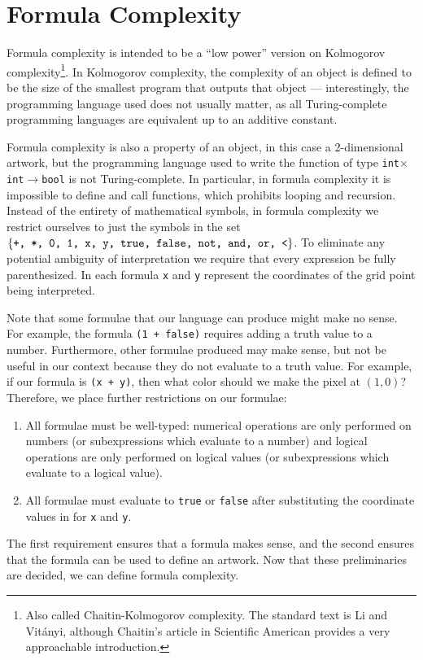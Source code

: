 \documentclass[11pt]{article}
\begin{document}
\section*{Formula Complexity}

Formula complexity is intended to be a ``low power'' version on Kolmogorov
complexity\footnote{Also called Chaitin-Kolmogorov complexity.  The standard
text is Li and Vit\'anyi\cite{Li}, although Chaitin's article in
Scientific American\cite{chaitin} provides a very approachable introduction.}.  In
Kolmogorov complexity, the complexity of an object is defined to be the size of
the smallest program that outputs that object --- interestingly, the
programming language used does not usually matter, as all Turing-complete
programming languages are equivalent up to an additive constant.

Formula complexity is also a property of an object, in this case a
2-dimensional artwork, but the programming language used to write the function
of type {\tt int$\times$int$\to$bool} is not Turing-complete.  In particular,
in formula complexity it is impossible to define and call functions, which
prohibits looping and recursion.  Instead of the entirety of mathematical
symbols, in formula complexity we restrict ourselves to just the symbols in the
set $\{\text{\tt +, *, 0, 1, x, y, true, false, not, and, or, <}\}$. To
eliminate any potential ambiguity of interpretation we require that every
expression be fully parenthesized.  In each formula {\tt x} and {\tt y}
represent the coordinates of the grid point being interpreted.  

Note that some formulae that our language can produce might make no sense.  For
example, the formula {\tt (1 + false)} requires adding a truth value to a
number.  Furthermore, other formulae produced may make sense, but not be useful
in our context because they do not evaluate to a truth value.  For example, if
our formula is {\tt (x + y)}, then what color should we make the pixel at
$(1,0)$?  Therefore, we place further restrictions on our formulae:
\begin{enumerate}
\item All formulae must be well-typed: numerical operations are only performed
on numbers (or subexpressions which evaluate to a number) and logical operations
are only performed on logical values (or subexpressions which evaluate to a
logical value).
\item All formulae must evaluate to {\tt true} or {\tt false} after
substituting the coordinate values in for {\tt x} and {\tt y}.
\end{enumerate}
The first requirement ensures that a formula makes sense, and the second
ensures that the formula can be used to define an artwork.  Now that these
preliminaries are decided, we can define formula complexity.
\end{document}

